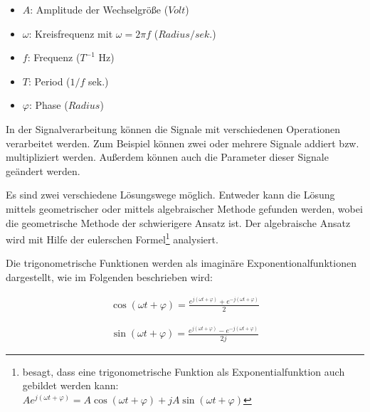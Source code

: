 \begin{itemize}
	\item $A$: Amplitude der Wechselgröße ($Volt$)
	\item $\omega$: Kreisfrequenz mit $\omega = 2 \pi f$ ($Radius/sek.$)
	\item $f$: Frequenz ($T^{-1}$ Hz)
	\item $T$: Period ($1/f$ sek.)
	\item $\varphi$: Phase ($Radius$)
\end{itemize}

In der Signalverarbeitung können die Signale mit verschiedenen Operationen verarbeitet werden. Zum Beispiel können zwei oder mehrere Signale addiert bzw. multipliziert werden. Außerdem können auch die Parameter dieser Signale geändert werden. \smallskip \smallskip

Es sind zwei verschiedene Lösungswege möglich. Entweder kann die Lösung mittels geometrischer oder mittels algebraischer Methode gefunden werden, wobei die geometrische Methode der schwierigere Ansatz ist. Der algebraische Ansatz wird mit Hilfe der eulerschen Formel\footnote{besagt, dass eine trigonometrische Funktion als Exponentialfunktion auch gebildet werden kann: \\ $A e^{j(\omega t + \varphi)} = A \cos(\omega t + \varphi) + j A \sin(\omega t + \varphi)$} analysiert. \smallskip \smallskip



Die trigonometrische Funktionen werden als imaginäre Exponentionalfunktionen dargestellt, wie im Folgenden beschrieben wird:

\begin{align}
	\cos (\omega t + \varphi) = \frac{e^{j(\omega t + \varphi)} + e^{-j(\omega t + \varphi)}}{2}\label{euler:cos}
\end{align}

\begin{align}
	\sin (\omega t + \varphi) = \frac{e^{j(\omega t + \varphi)} - e^{-j(\omega t + \varphi)}}{2j}\label{euler:sin}
\end{align}
\smallskip \smallskip

